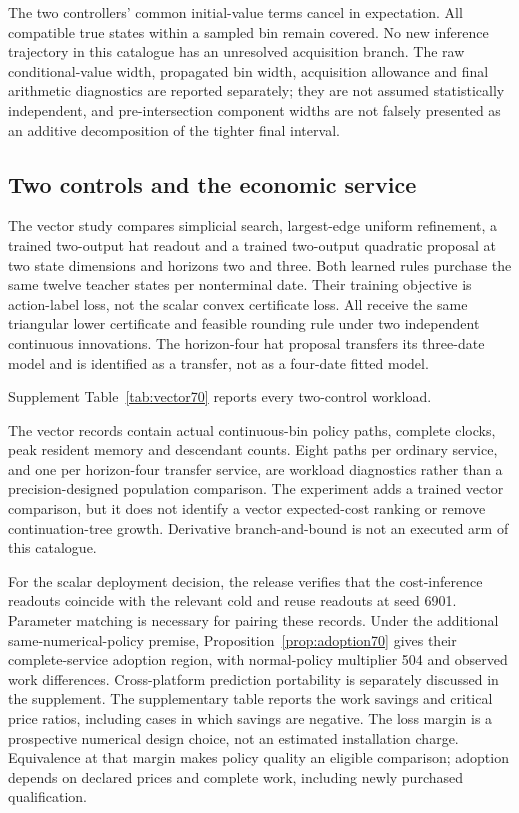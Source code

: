 The two controllers' common initial-value terms cancel in expectation. All compatible true states within a sampled bin remain covered. No new inference trajectory in this catalogue has an unresolved acquisition branch. The raw conditional-value width, propagated bin width, acquisition allowance and final arithmetic diagnostics are reported separately; they are not assumed statistically independent, and pre-intersection component widths are not falsely presented as an additive decomposition of the tighter final interval.

\subsection{Two controls and the economic service}
The vector study compares simplicial search, largest-edge uniform refinement, a trained two-output hat readout and a trained two-output quadratic proposal at two state dimensions and horizons two and three. Both learned rules purchase the same twelve teacher states per nonterminal date. Their training objective is action-label loss, not the scalar convex certificate loss. All receive the same triangular lower certificate and feasible rounding rule under two independent continuous innovations. The horizon-four hat proposal transfers its three-date model and is identified as a transfer, not as a four-date fitted model.

Supplement Table~\ref{tab:vector70} reports every two-control workload.

The vector records contain actual continuous-bin policy paths, complete clocks, peak resident memory and descendant counts. Eight paths per ordinary service, and one per horizon-four transfer service, are workload diagnostics rather than a precision-designed population comparison. The experiment adds a trained vector comparison, but it does not identify a vector expected-cost ranking or remove continuation-tree growth. Derivative branch-and-bound is not an executed arm of this catalogue.

For the scalar deployment decision, the release verifies that the cost-inference readouts coincide with the relevant cold and reuse readouts at seed 6901. Parameter matching is necessary for pairing these records. Under the additional same-numerical-policy premise, Proposition~\ref{prop:adoption70} gives their complete-service adoption region, with normal-policy multiplier 504 and observed work differences. Cross-platform prediction portability is separately discussed in the supplement. The supplementary table reports the work savings and critical price ratios, including cases in which savings are negative. The loss margin is a prospective numerical design choice, not an estimated installation charge. Equivalence at that margin makes policy quality an eligible comparison; adoption depends on declared prices and complete work, including newly purchased qualification.

